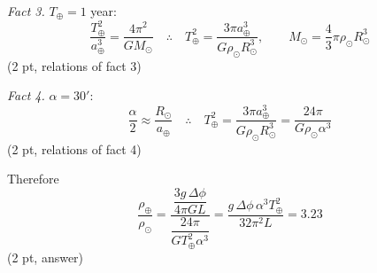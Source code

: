 \emph{Fact 3.} $T_\oplus = 1$ year:
\[ \frac{T_\oplus^2}{a_\oplus^3} = \frac{4\pi^2}{GM_\odot}
   \quad\therefore\quad
   T_\oplus^2 = \frac{3\pi a_\oplus^3}{G\rho_\odot R_\odot^3},
   \qquad M_\odot = \frac{4}{3}\pi \rho_\odot R_\odot^3 \]
\hfill(2 pt, relations of fact 3)

\emph{Fact 4.} $\alpha = 30'$:
\[ \frac{\alpha}{2} \approx \frac{R_\odot}{a_\oplus}
   \quad\therefore\quad
   T_\oplus^2 = \frac{3\pi a_\oplus^3}{G\rho_\odot R_\odot^3}
   = \frac{24\pi}{G\rho_\odot \alpha^3} \]
\hfill(2 pt, relations of fact 4)

Therefore
\[ \frac{\rho_\oplus}{\rho_\odot}
   = \frac{\dfrac{3g\,\Delta\phi}{4\pi G L}}{\dfrac{24\pi}{G T_\oplus^2 \alpha^3}}
   = \frac{g\,\Delta\phi\,\alpha^3 T_\oplus^2}{32\pi^2 L} = 3.23 \]
\hfill(2 pt, answer)

